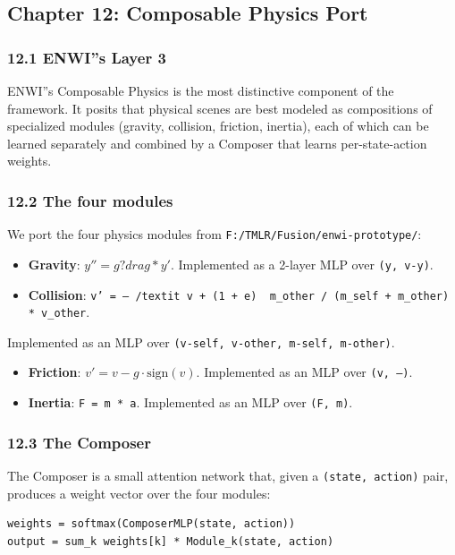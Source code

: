 \documentclass[11pt]{article}
\begin{document}
\subsection{Chapter 12: Composable Physics Port}

\subsubsection{12.1 ENWI''s Layer 3}

ENWI''s Composable Physics is the most distinctive component of the framework.
It posits that physical scenes are best modeled as compositions of specialized
modules (gravity, collision, friction, inertia), each of which can be learned
separately and combined by a Composer that learns per-state-action weights.

\subsubsection{12.2 The four modules}

We port the four physics modules from \texttt{F:/TMLR/Fusion/enwi-prototype/}:

\begin{itemize}
  \item \textbf{Gravity}: $y'' = g ?drag * y'$. Implemented as a 2-layer MLP over \texttt{(y, v-y)}.
  \item \textbf{Collision}: \texttt{v' = -- /textit{ v + (1 + e) } m\_other / (m\_self + m\_other) * v\_other}.
\end{itemize}

  Implemented as an MLP over \texttt{(v-self, v-other, m-self, m-other)}.
\begin{itemize}
  \item \textbf{Friction}: $v' = v - \textit{g} \cdot \text{sign}(v)$. Implemented as an MLP over \texttt{(v, --)}.
  \item \textbf{Inertia}: \texttt{F = m * a}. Implemented as an MLP over \texttt{(F, m)}.
\end{itemize}


\subsubsection{12.3 The Composer}

The Composer is a small attention network that, given a \texttt{(state, action)} pair,
produces a weight vector over the four modules:

\begin{verbatim}
weights = softmax(ComposerMLP(state, action))
output = sum_k weights[k] * Module_k(state, action)
\end{verbatim}
\end{document}
